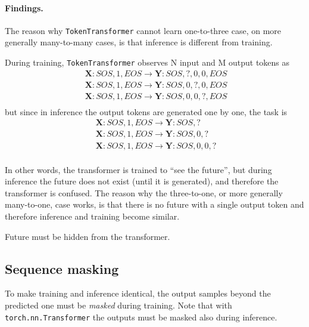 \documentclass[final]{article}
\begin{document}
\paragraph{Findings.}
The reason why \texttt{TokenTransformer} cannot learn one-to-three case, on
more generally many-to-many cases, is that inference is different from
training.

During training, \texttt{TokenTransformer} observes N input and M output tokens as
\begin{displaymath}
  \begin{split}
    &\mathbf{X}: SOS,1,EOS \rightarrow \mathbf{Y}: SOS,?, 0, 0,EOS\\
    &\mathbf{X}: SOS,1,EOS \rightarrow \mathbf{Y}: SOS,0, ?, 0,EOS\\
    &\mathbf{X}: SOS,1,EOS \rightarrow \mathbf{Y}: SOS,0, 0, ?,EOS\\
  \end{split} \enspace
\end{displaymath}
but since in inference the output tokens are generated one by one, the task is
\begin{displaymath}
  \begin{split}
    &\mathbf{X}: SOS,1,EOS \rightarrow \mathbf{Y}: SOS,?\\
    &\mathbf{X}: SOS,1,EOS \rightarrow \mathbf{Y}: SOS,0, ?\\
    &\mathbf{X}: SOS,1,EOS \rightarrow \mathbf{Y}: SOS,0, 0, ?\\
  \end{split} \enspace
\end{displaymath}

In other words, the transformer is trained to ``see the future'', but during inference the future does not exist (until it is generated), and therefore the transformer is confused. The reason why the three-to-one, or more generally many-to-one, case works, is that there is no future with a single output token and therefore inference and training become similar.

Future must be hidden from the transformer.

\subsection{Sequence masking}
To make training and inference identical, the output samples beyond the predicted one must be \textit{masked} during training. Note that with \texttt{torch.nn.Transformer} the outputs must be masked also during inference.
\end{document}

